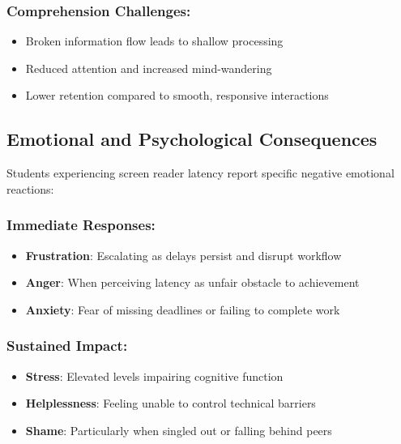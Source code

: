 \subsubsection{Comprehension Challenges:}

\begin{itemize}
\item Broken information flow leads to shallow processing \cite{Craik1972LevelsOfProcessing}
\item Reduced attention and increased mind-wandering \cite{Smallwood2011MindWandering}
\item Lower retention compared to smooth, responsive interactions \cite{Kintsch1998Comprehension}
\end{itemize}

\subsection{Emotional and Psychological Consequences}\label{emotional-and-psychological-consequences}

Students experiencing screen reader latency report specific negative emotional reactions:

\subsubsection{Immediate Responses:}

\begin{itemize}
\item \textbf{Frustration}: Escalating as delays persist and disrupt workflow \cite{Lazarus1991EmotionAndAdaptation}
\item \textbf{Anger}: When perceiving latency as unfair obstacle to achievement \cite{Fogg2003PersuasiveTechnology}
\item \textbf{Anxiety}: Fear of missing deadlines or failing to complete work \cite{Zeidner1998TestAnxiety}
\end{itemize}


\subsubsection{Sustained Impact:}

\begin{itemize}
\item \textbf{Stress}: Elevated levels impairing cognitive function \cite{Sapolsky2004WhyZebrasDontGetUlcers}
\item \textbf{Helplessness}: Feeling unable to control technical barriers \cite{Seligman1975Helplessness}
\item \textbf{Shame}: Particularly when singled out or falling behind peers \cite{Brown2010TheGiftsOfImperfection}
\end{itemize}


